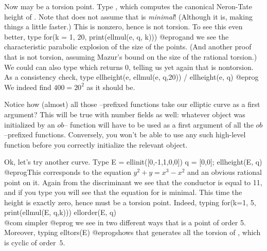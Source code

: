 Now  may be a torsion point. Type , which
computes the canonical Neron-Tate height of . Note that
 does not assume that  is \emph{minimal}! (Although
it is, making things a little faster.)
This is nonzero, hence  is not torsion. To see this even better,
type
\bprog
  for(k = 1, 20, print(ellmul(e, q, k)))
@eprog\noindent and we see the characteristic parabolic explosion of the size
of the points. (And another proof that  is not torsion, assuming
Mazur's bound on the size of the rational torsion.) We could can also type
 which returns 0, telling us yet again that  is
nontorsion. As a consistency check, type
\bprog
  ellheight(e, ellmul(e, q,20)) / ellheight(e, q)
@eprog\noindent
We indeed find $400=20^2$ as it should be.

Notice how (almost) all those --prefixed functions take our
elliptic curve as a first argument? This will be true with number
fields as well: whatever object was initialized by an $ob$--
function will have to be used as a first argument of all the
$ob$--prefixed functions. Conversely, you won't be able to use any
such high-level function before you correctly initialize the relevant
object. \smallskip

Ok, let's try another curve. Type
\bprog
  E = ellinit([0,-1,1,0,0])
  q = [0,0]; ellheight(E, q)
@eprog\noindent This corresponds to the equation $y^2+y = x^3-x^2$ and an
obvious rational point on it. Again from the discriminant we see that the
conductor is equal to 11, and if you type  you will
see that the equation  for  is minimal. This time the height is
exactly zero, hence  must be a torsion point. Indeed, typing
\bprog
  for(k=1, 5, print(ellmul(E, q,k)))
  ellorder(E, q)   \\@com simpler
@eprog\noindent
we see in two different ways that  is a point of order 5. Moreover,
typing
\bprog
  elltors(E)
@eprog\noindent shows that  generates all the torsion of ,
which is cyclic of order~$5$. \smallskip

